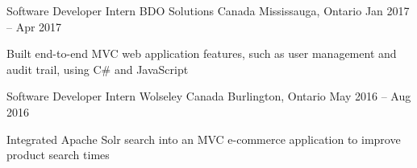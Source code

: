 \begin{cventries}
  \cventry
    {Software Developer Intern} %
    {BDO Solutions Canada} %
    {Mississauga, Ontario} %
    {Jan 2017 -- Apr 2017} %
    {
      \begin{cvitems}
        \item {Built end-to-end MVC web application
        features, such as user management and audit
        trail, using C\# and JavaScript}
      \end{cvitems}
    } %

  \cventry
    {Software Developer Intern} %
    {Wolseley Canada} %
    {Burlington, Ontario} %
    {May 2016 -- Aug 2016} %
    {
      \begin{cvitems}
        \item {Integrated Apache Solr search into an MVC
        e-commerce application to improve product search
        times}
      \end{cvitems}
    } %

\end{cventries}

